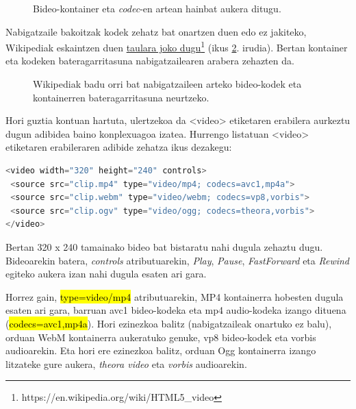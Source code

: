 \begin{figure}[ht]
	\centering
{}
\caption{Bideo-kontainer eta \textit{codec}-en artean hainbat aukera ditugu.}
\label{fig:bideokodek}
\end{figure}

Nabigatzaile bakoitzak kodek zehatz bat onartzen duen edo ez jakiteko, Wikipediak eskaintzen duen \href{https://en.wikipedia.org/wiki/HTML5_video}{taulara joko dugu}\footnote{https://en.wikipedia.org/wiki/HTML5\_video} (ikus \ref{fig:bideokodekwikipedia}. irudia). Bertan kontainer eta kodeken bateragarritasuna nabigatzailearen arabera zehazten da.



\begin{figure}[ht]
	\centering
{}
\caption{Wikipediak badu orri bat nabigatzaileen arteko bideo-kodek eta kontainerren bateragarritasuna neurtzeko.}
\label{fig:bideokodekwikipedia}
\end{figure}


Hori guztia kontuan hartuta, ulertzekoa da <video> etiketaren erabilera aurkeztu dugun adibidea baino konplexuagoa izatea. Hurrengo listatuan <video> etiketaren erabileraren adibide zehatza ikus dezakegu:

\begin{lstlisting}[language=JavaScript,label={lst:bideoadibidea}]
<video width="320" height="240" controls>
 <source src="clip.mp4" type="video/mp4; codecs=avc1,mp4a">
 <source src="clip.webm" type="video/webm; codecs=vp8,vorbis">
 <source src="clip.ogv" type="video/ogg; codecs=theora,vorbis">
</video>
\end{lstlisting}

Bertan 320 x 240 tamainako bideo bat bistaratu nahi dugula zehaztu dugu. Bideoarekin batera, \textit{controls} atributuarekin, \textit{Play}, \textit{Pause}, \textit{FastForward} eta \textit{Rewind} egiteko aukera izan nahi dugula esaten ari gara.

Horrez gain, \hl{type=video/mp4} atributuarekin, MP4 kontainerra hobesten dugula esaten ari gara, barruan avc1 bideo-kodeka eta mp4 audio-kodeka izango dituena (\hl{codecs=avc1,mp4a}). Hori ezinezkoa balitz (nabigatzaileak onartuko ez balu), orduan WebM kontainerra aukeratuko genuke, vp8  bideo-kodek eta vorbis audioarekin. Eta hori ere ezinezkoa balitz, orduan Ogg  kontainerra izango litzateke gure aukera, \textit{theora video} eta \textit{vorbis} audioarekin.


